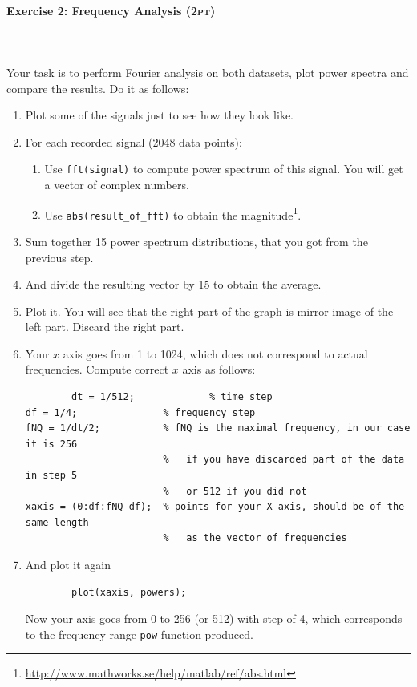\documentclass[a4paper,11pt]{article}
\newenvironment{exercise}[3]{\paragraph{Exercise #1: #2 \textsc{(#3pt)}}\ \\}{
\medskip}
\begin{document}
\begin{exercise}{2}{Frequency Analysis}{2}
\ \\
Your task is to perform Fourier analysis on both datasets, plot power spectra and compare the results. Do it as follows:
\begin{enumerate}
	\item Plot some of the signals just to see how they look like.
	\item For each recorded signal (2048 data points):
		\begin{enumerate}
			\item Use \texttt{fft(signal)} to compute power spectrum of this signal. You will get a vector of complex numbers.
			\item Use \texttt{abs(result\_of\_fft)} to obtain the magnitude\footnote{\url{http://www.mathworks.se/help/matlab/ref/abs.html}}.
		\end{enumerate}
	\item Sum together 15 power spectrum distributions, that you got from the previous step.
	\item And divide the resulting vector by 15 to obtain the average.
	\item Plot it. You will see that the right part of the graph is mirror image of the left part. Discard the right part.
	\item Your $x$ axis goes from 1 to 1024, which does not correspond to actual frequencies. Compute correct $x$ axis as follows:
		\begin{verbatim}
		dt = 1/512;             % time step
df = 1/4;               % frequency step
fNQ = 1/dt/2;           % fNQ is the maximal frequency, in our case it is 256
                        %   if you have discarded part of the data in step 5 
                        %   or 512 if you did not
xaxis = (0:df:fNQ-df);  % points for your X axis, should be of the same length 
                        %   as the vector of frequencies
		\end{verbatim}
	\item And plot it again
		\begin{verbatim}
		plot(xaxis, powers);
		\end{verbatim}
		Now your axis goes from 0 to 256 (or 512) with step of 4, which corresponds to the frequency range \texttt{pow} function produced.
\end{enumerate}


\end{exercise}
\end{document}
